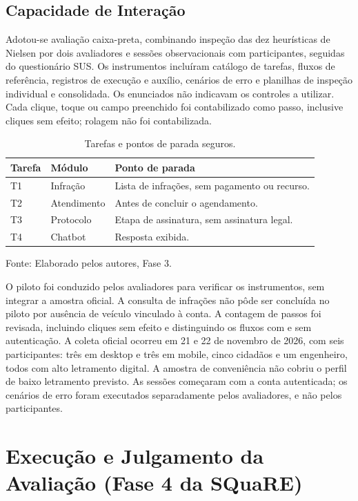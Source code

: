 \documentclass[12pt]{article}
\begin{document}
\subsection{Capacidade de Interação}
Adotou-se avaliação caixa-preta, combinando inspeção das dez heurísticas de Nielsen por dois avaliadores e sessões observacionais com participantes, seguidas do questionário SUS. Os instrumentos incluíram catálogo de tarefas, fluxos de referência, registros de execução e auxílio, cenários de erro e planilhas de inspeção individual e consolidada. Os enunciados não indicavam os controles a utilizar. Cada clique, toque ou campo preenchido foi contabilizado como passo, inclusive cliques sem efeito; rolagem não foi contabilizada.

\begin{table}[htbp]
\centering
\caption{Tarefas e pontos de parada seguros.}
\begin{tabular}{lp{4cm}p{6cm}}
\toprule Tarefa & Módulo & Ponto de parada \\ \midrule
T1 & Infração & Lista de infrações, sem pagamento ou recurso.\\
T2 & Atendimento & Antes de concluir o agendamento.\\
T3 & Protocolo & Etapa de assinatura, sem assinatura legal.\\
T4 & Chatbot & Resposta exibida.\\ \bottomrule
\end{tabular}
\par\small Fonte: Elaborado pelos autores, Fase 3.
\end{table}
O piloto foi conduzido pelos avaliadores para verificar os instrumentos, sem integrar a amostra oficial. A consulta de infrações não pôde ser concluída no piloto por ausência de veículo vinculado à conta. A contagem de passos foi revisada, incluindo cliques sem efeito e distinguindo os fluxos com e sem autenticação. A coleta oficial ocorreu em 21 e 22 de novembro de 2026, com seis participantes: três em desktop e três em mobile, cinco cidadãos e um engenheiro, todos com alto letramento digital. A amostra de conveniência não cobriu o perfil de baixo letramento previsto. As sessões começaram com a conta autenticada; os cenários de erro foram executados separadamente pelos avaliadores, e não pelos participantes.

\section{Execução e Julgamento da Avaliação (Fase 4 da SQuaRE)}
\end{document}
